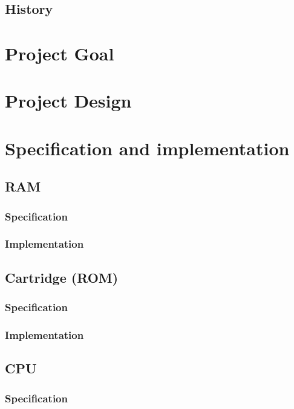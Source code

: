\documentclass[]{report}
\begin{document}
\section{History}



\chapter{Project Goal}

\chapter{Project Design}

\chapter{Specification and implementation}

\section{RAM}

\subsection{Specification}

\subsection{Implementation}

\section{Cartridge (ROM)}

\subsection{Specification}

\subsection{Implementation}

\section{CPU}

\subsection{Specification}
\end{document}
